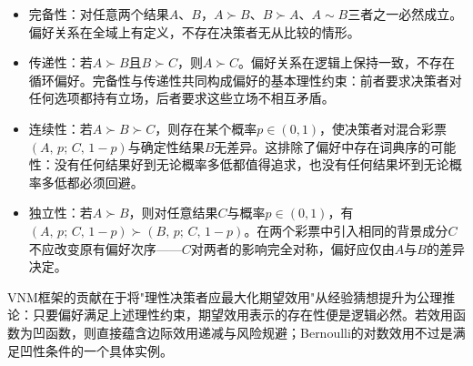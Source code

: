 \begin{itemize}
    \item 完备性：对任意两个结果$A$、$B$，$A \succ B$、$B \succ A$、$A \sim B$三者之一必然成立。偏好关系在全域上有定义，不存在决策者无从比较的情形。
    \item 传递性：若$A \succ B$且$B \succ C$，则$A \succ C$。偏好关系在逻辑上保持一致，不存在循环偏好。完备性与传递性共同构成偏好的基本理性约束：前者要求决策者对任何选项都持有立场，后者要求这些立场不相互矛盾。
    \item 连续性：若$A \succ B \succ C$，则存在某个概率$p \in (0,1)$，使决策者对混合彩票$(A,\,p;\,C,\,1-p)$与确定性结果$B$无差异。这排除了偏好中存在词典序的可能性：没有任何结果好到无论概率多低都值得追求，也没有任何结果坏到无论概率多低都必须回避。
    \item 独立性：若$A \succ B$，则对任意结果$C$与概率$p \in (0,1)$，有$(A,\,p;\,C,\,1-p) \succ (B,\,p;\,C,\,1-p)$。在两个彩票中引入相同的背景成分$C$不应改变原有偏好次序——$C$对两者的影响完全对称，偏好应仅由$A$与$B$的差异决定。
\end{itemize}

VNM框架的贡献在于将"理性决策者应最大化期望效用"从经验猜想提升为公理推论：只要偏好满足上述理性约束，期望效用表示的存在性便是逻辑必然。若效用函数为凹函数，则直接蕴含边际效用递减与风险规避；Bernoulli的对数效用不过是满足凹性条件的一个具体实例。

